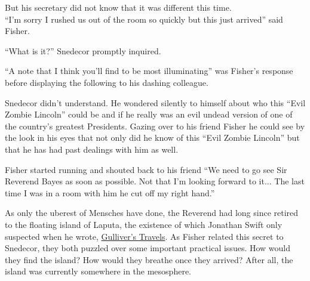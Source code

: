\documentclass{article}
\begin{document}
But his secretary did not know that it was different this time.\\


``I'm sorry I rushed us out of the room so quickly but this just arrived'' said Fisher. 

``What is it?'' Snedecor promptly inquired.

``A note that I think you'll find to be most illuminating'' was Fisher's response before displaying the following to his dashing colleague.


\Fontauri
\Large 
\begin{center}
\end{center}


\normalfont
\normalsize
\vspace{.5in}

Snedecor didn't understand.  He wondered silently to himself about who this ``Evil Zombie Lincoln'' could be and if he really was an evil undead version of one of the country's greatest Presidents.  Gazing over to his friend Fisher he could see by the look in his eyes that not only did he know of this ``Evil Zombie Lincoln'' but that he has had past dealings with him as well.

Fisher started running and shouted back to his friend ``We need to go see Sir Reverend Bayes as soon as possible.  Not that I'm looking forward to it... The last time I was in a room with him he cut off my right hand.''




As only the uberest of Mensches have done, the Reverend had long since retired to the floating island of Laputa, the existence of which Jonathan Swift only suspected when he wrote, \underline{Gulliver's Travels}. As Fisher related this secret to Snedecor, they both puzzled over some important practical issues. How would they find the island? How would they breathe once they arrived? After all, the island was currently somewhere in the mesosphere. \newline
\end{document}
